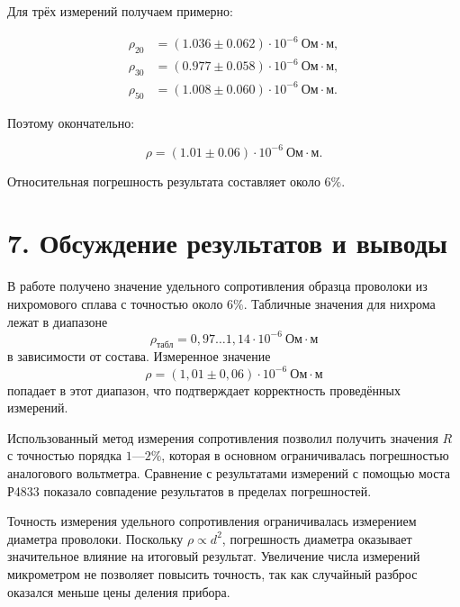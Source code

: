 \documentclass[12pt,a4paper]{article}
\begin{document}
Для трёх измерений получаем примерно:

\begin{align}
\rho_{20}
&=
(1.036\pm0.062)
\cdot10^{-6}\ \text{Ом}\cdot\text{м},
\\
\rho_{30}
&=
(0.977\pm0.058)
\cdot10^{-6}\ \text{Ом}\cdot\text{м},
\\
\rho_{50}
&=
(1.008\pm0.060)
\cdot10^{-6}\ \text{Ом}\cdot\text{м}.
\end{align}

Поэтому окончательно:

\begin{equation}
\boxed{
\rho=
(1.01\pm0.06)
\cdot10^{-6}\ \text{Ом}\cdot\text{м}
}.
\end{equation}

Относительная погрешность результата составляет около $6\%$.

\section*{7. Обсуждение результатов и выводы}

В работе получено значение удельного сопротивления образца проволоки
из нихромового сплава с точностью около $6\%$. Табличные значения
для нихрома лежат в диапазоне
\[
\rho_{\text{табл}}=0{,}97\ldots1{,}14\cdot10^{-6}\ \text{Ом}\cdot\text{м}
\]
в зависимости от состава. Измеренное значение
\[
\rho=(1{,}01\pm0{,}06)\cdot10^{-6}\ \text{Ом}\cdot\text{м}
\]
попадает в этот диапазон, что подтверждает корректность проведённых
измерений.

Использованный метод измерения сопротивления позволил получить значения
$R$ с точностью порядка $1$---$2\%$, которая в основном ограничивалась
погрешностью аналогового вольтметра. Сравнение с результатами измерений
с помощью моста Р4833 показало совпадение результатов в пределах
погрешностей.

Точность измерения удельного сопротивления ограничивалась
измерением диаметра проволоки. Поскольку $\rho\propto d^2$, погрешность
диаметра оказывает значительное влияние на итоговый результат.
Увеличение числа измерений микрометром не позволяет повысить
точность, так как случайный разброс оказался меньше цены деления прибора.
\end{document}

